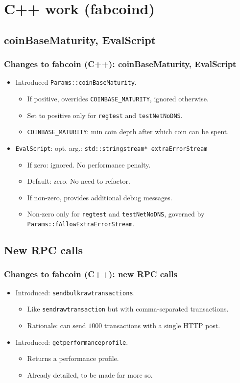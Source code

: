 \section{C++ work (fabcoind)}
\subsection{coinBaseMaturity, EvalScript}
\begin{frame}[fragile]
\frametitle{Changes to fabcoin (C++): coinBaseMaturity, EvalScript}
\begin{itemize}
\item Introduced \verb|Params::coinBaseMaturity|.
\begin{itemize}
\item If positive, overrides \verb|COINBASE_MATURITY|, ignored otherwise. 
\item Set to positive only for \verb|regtest| and \verb|testNetNoDNS|.
\item \verb|COINBASE_MATURITY|: min coin depth after which coin can be spent.
\end{itemize}
\item \verb|EvalScript|: opt. arg.: \verb|std::stringstream* extraErrorStream|
\begin{itemize}
	\item If zero: ignored. No performance penalty.
	\item Default: zero. No need to refactor.
	\item If non-zero, provides additional debug messages.
	\item Non-zero only for \verb|regtest| and \verb|testNetNoDNS|, governed by \verb|Params::fAllowExtraErrorStream|.
\end{itemize}
\end{itemize}

\end{frame}

\subsection{New RPC calls}
\begin{frame}[fragile]
\frametitle{Changes to fabcoin (C++): new RPC calls}
\begin{itemize}
\item Introduced: \verb|sendbulkrawtransactions|. 
\begin{itemize}
\item Like \verb|sendrawtransaction| but with comma-separated transactions.
\item Rationale: can send $1000$ transactions with a single HTTP post.
\end{itemize}
\item Introduced: \verb|getperformanceprofile|.
\begin{itemize}
\item Returns a performance profile. 
\item Already detailed, to be made far more so.
\end{itemize}
\end{itemize}

\end{frame}
